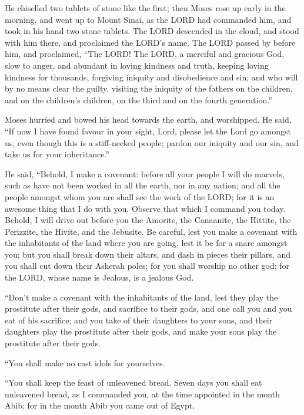  He chiselled two tablets of stone like the first; then
Moses rose up early in the morning, and went up to Mount Sinai, as the
LORD had commanded him, and took in his hand two stone tablets.
 The LORD descended in the cloud, and stood with him
there, and proclaimed the LORD's name.  The LORD passed by
before him, and proclaimed, ``The LORD! The LORD, a merciful and
gracious God, slow to anger, and abundant in loving kindness and truth,
 keeping loving kindness for thousands, forgiving iniquity
and disobedience and sin; and who will by no means clear the guilty,
visiting the iniquity of the fathers on the children, and on the
children's children, on the third and on the fourth generation.''

 Moses hurried and bowed his head towards the earth, and
worshipped.  He said, ``If now I have found favour in your
sight, Lord, please let the Lord go amongst us, even though this is a
stiff-necked people; pardon our iniquity and our sin, and take us for
your inheritance.''

 He said, ``Behold, I make a covenant: before all your
people I will do marvels, such as have not been worked in all the earth,
nor in any nation; and all the people amongst whom you are shall see the
work of the LORD; for it is an awesome thing that I do with you.
 Observe that which I command you today. Behold, I will
drive out before you the Amorite, the Canaanite, the Hittite, the
Perizzite, the Hivite, and the Jebusite.  Be careful,
lest you make a covenant with the inhabitants of the land where you are
going, lest it be for a snare amongst you;  but you shall
break down their altars, and dash in pieces their pillars, and you shall
cut down their Asherah poles;  for you shall worship no
other god; for the LORD, whose name is Jealous, is a jealous God.

 ``Don't make a covenant with the inhabitants of the
land, lest they play the prostitute after their gods, and sacrifice to
their gods, and one call you and you eat of his sacrifice;
 and you take of their daughters to your sons, and their
daughters play the prostitute after their gods, and make your sons play
the prostitute after their gods.

 ``You shall make no cast idols for yourselves.

 ``You shall keep the feast of unleavened bread. Seven
days you shall eat unleavened bread, as I commanded you, at the time
appointed in the month Abib; for in the month Abib you came out of
Egypt.

